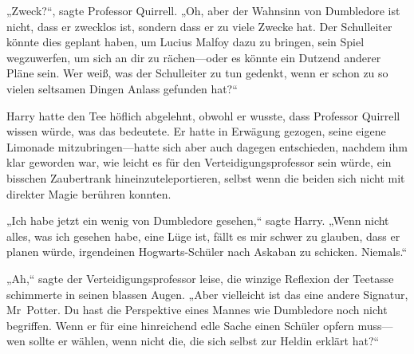 „Zweck?“, sagte Professor Quirrell. „Oh, aber der Wahnsinn von Dumbledore ist nicht, dass er zwecklos ist, sondern dass er zu viele Zwecke hat. Der Schulleiter könnte dies geplant haben, um Lucius Malfoy dazu zu bringen, sein Spiel wegzuwerfen, um sich an dir zu rächen—oder es könnte ein Dutzend anderer Pläne sein. Wer weiß, was der Schulleiter zu tun gedenkt, wenn er schon zu so vielen seltsamen Dingen Anlass gefunden hat?“

Harry hatte den Tee höflich abgelehnt, obwohl er wusste, dass Professor Quirrell wissen würde, was das bedeutete. Er hatte in Erwägung gezogen, seine eigene Limonade mitzubringen—hatte sich aber auch dagegen entschieden, nachdem ihm klar geworden war, wie leicht es für den Verteidigungsprofessor sein würde, ein bisschen Zaubertrank hineinzuteleportieren, selbst wenn die beiden sich nicht mit direkter Magie berühren konnten.

„Ich habe jetzt ein wenig von Dumbledore gesehen,“ sagte Harry. „Wenn nicht alles, was ich gesehen habe, eine Lüge ist, fällt es mir schwer zu glauben, dass er planen würde, irgendeinen Hogwarts-Schüler nach Askaban zu schicken. Niemals.“

„Ah,“ sagte der Verteidigungsprofessor leise, die winzige Reflexion der Teetasse schimmerte in seinen blassen Augen. „Aber vielleicht ist das eine andere Signatur, Mr~Potter. Du hast die Perspektive eines Mannes wie Dumbledore noch nicht begriffen. Wenn er für eine hinreichend edle Sache einen Schüler opfern muss—wen sollte er wählen, wenn nicht die, die sich selbst zur Heldin erklärt hat?“

